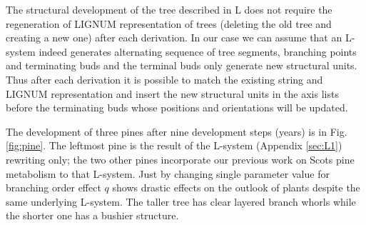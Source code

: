 The structural development of the tree described in L does not require
the regeneration  of LIGNUM representation of trees  (deleting the old
tree and  creating a new one)  after each derivation.  In  our case we
can assume  that an L-system indeed generates  alternating sequence of
tree segments, branching points  and terminating buds and the terminal
buds only  generate new structural units.  Thus  after each derivation
it is possible to match  the existing string and LIGNUM representation
and  insert the  new structural  units in  the axis  lists  before the
terminating buds whose positions and orientations will be updated.

The development of three pines after nine development steps (years) is
in  Fig.  \ref{fig:pine}.   The leftmost  pine  is the  result of  the
L-system (Appendix  \ref{sec:L1}) rewriting only; the  two other pines
incorporate   our    previous   work   on    Scots   pine   metabolism
\citep{perttunen:96,perttunen:98} to that  L-system.  Just by changing
single    parameter   value   for    branching   order    effect   $q$
\citep[see][]{perttunen:98}  shows drastic effects  on the  outlook of
plants despite the same underlying L-system. The taller tree has clear
layered branch whorls while the shorter one has a bushier structure.


